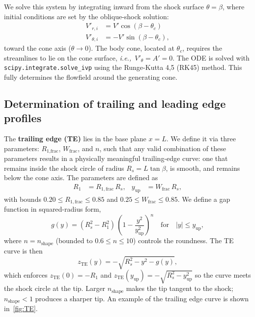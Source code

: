 \documentclass[10pt,a4paper]{article}
\begin{document}
We solve this system by integrating inward from the shock surface $\theta = \beta$, where initial conditions are set by the oblique-shock solution:
\begin{align}
    V'_{r,i} &= V' \cos(\beta - \theta_c)\label{eq:Vri} \\
    V'_{\theta,i} &= -V' \sin(\beta - \theta_c),\label{eq:Vthetai}
\end{align}
toward the cone axis ($\theta \to 0$). The body cone, located at $\theta_c$, requires the streamlines to lie on the cone surface, \textit{i.e.,}\ $V'_\theta = A' = 0$. The ODE is solved with \texttt{scipy.integrate.solve\_ivp} using the Runge-Kutta 4,5 (RK45) method. This fully determines the flowfield around the generating cone.

\subsection{Determination of trailing and leading edge profiles}\label{sec:LE}

The \textbf{trailing edge (TE)} lies in the base plane $x = L$. We define it via three parameters: $R_\text{1,frac}$, $W_\text{frac}$, and $n$, such that any valid combination of these parameters results in a physically meaningful trailing-edge curve: one that remains inside the shock circle of radius $R_s = L\tan\beta$, is smooth, and remains below the cone axis. The parameters are defined as
\begin{align}
    R_1 &= R_{1,\mathrm{frac}}\,R_s, & y_{\mathrm{up}} &= W_{\mathrm{frac}}\,R_s,
\end{align}
with bounds $0.20 \le R_{1,\mathrm{frac}} \le 0.85$ and $0.25 \le W_{\mathrm{frac}} \le 0.85$. We define a gap function in squared-radius form,
\begin{equation}
    g(y) = (R_s^2 - R_1^2)\,\left(1 - \frac{y^2}{y_{\mathrm{up}}^2}\right)^{n}
    \quad\text{for}\quad |y| \le y_{\mathrm{up}},
\end{equation}
where $n = n_{\mathrm{shape}}$ (bounded to $0.6 \le n \le 10$) controls the roundness.  The TE curve is then
\begin{equation}
    z_{\mathrm{TE}}(y) = -\sqrt{R_s^2 - y^2 - g(y)},
    \label{eq:TE}
\end{equation}
which enforces $z_{\mathrm{TE}}(0) = -R_1$ and $z_{\mathrm{TE}}(y_{\mathrm{up}}) = -\sqrt{R_s^2 - y_{\mathrm{up}}^2}$ so the curve meets the shock circle at the tip.  Larger $n_{\mathrm{shape}}$ makes the tip tangent to the shock; $n_{\mathrm{shape}} < 1$ produces a sharper tip. An example of the trailing edge curve is shown in~\cref{fig:TE}.
\end{document}
